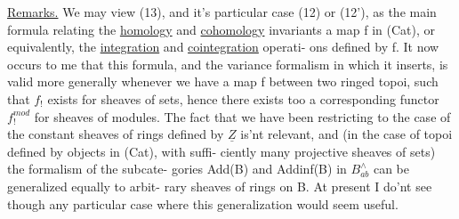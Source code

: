 \uline{Remarks.}
We may view (13), and it's particular case (12) or (12'), as
the main formula relating the \uline{homology} and \uline{cohomology} invariants  a map
f in (Cat), or equivalently, the  \uline{integration} and \uline{cointegration} operati-%
ons defined by f. It now occurs to me that this formula,  and the
variance formalism in which it inserts, is valid more generally whenever
we have a map f between two  ringed topoi, such that $f_!$ exists
for sheaves of sets, hence there exists too a corresponding functor
$f^{mod}_!$ for sheaves of modules. The fact that we have been restricting to
the case of the constant sheaves of rings defined by $\underline{Z}$ is'nt relevant,
and (in the case of topoi defined by objects in (Cat),  with suffi-%
ciently many projective sheaves of sets) the formalism of the subcate-%
gories Add(B) and Addinf(B) in $B^\wedge_{ab}$ can be generalized equally to arbit-%
rary  sheaves of rings on B. At present I do'nt see though
any  particular case where this generalization would seem
useful.

